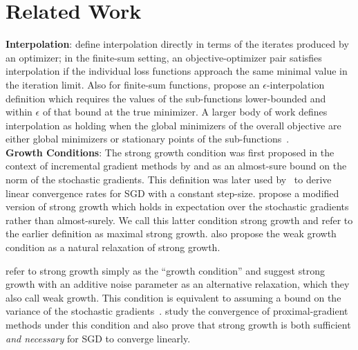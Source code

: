 




\section{Related Work}

\noindent \textbf{Interpolation}:
\citet{bassily2018exponential} define interpolation directly in terms of the iterates produced by an optimizer; in the finite-sum setting, an objective-optimizer pair satisfies interpolation if the individual loss functions approach the same minimal value in the iteration limit. 
Also for finite-sum functions, \citet{berrada2019training} propose an \( \epsilon \)-interpolation definition which requires the values of the sub-functions lower-bounded and within \( \epsilon  \) of that bound at the true minimizer. 
A larger body of work defines interpolation as holding when the global minimizers of the overall objective are either global minimizers or stationary points of the sub-functions~\cite{vaswani2019fast, vaswani2019painless, vaswani2020adaptive, meng2020fastandfurious, loizou2020sps}.\\

\noindent \textbf{Growth Conditions}:
The strong growth condition was first proposed in the context of incremental gradient methods by \citet{solodov1998incremental} and \citet{tseng1998incremental} as an almost-sure bound on the norm of the stochastic gradients. 
This definition was later used by~\citet{schmidt2013fast} to derive linear convergence rates for \ac{SGD} with a constant step-size. 
\citet{vaswani2019fast} propose a modified version of strong growth which holds in expectation over the stochastic gradients rather than almost-surely. 
We call this latter condition strong growth and refer to the earlier definition as maximal strong growth.
\citet{vaswani2019fast} also propose the weak growth condition as a natural relaxation of strong growth. 

\citet{cevher2018linear} refer to strong growth simply as the ``growth condition'' and suggest strong growth with an additive noise parameter as an alternative relaxation, which they also call weak growth.
This condition is equivalent to assuming a bound on the variance of the stochastic gradients~\citep{khaled2020better, ghadimi2012optimal1}.
\citet{cevher2018linear} study the convergence of proximal-gradient methods under this condition and also prove that strong growth is both sufficient \emph{and necessary} for \ac{SGD} to converge linearly.\\


